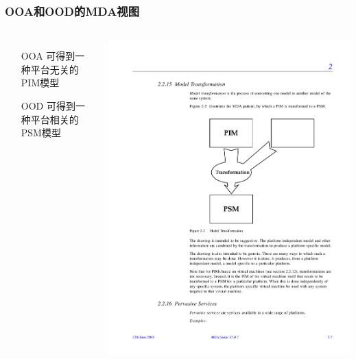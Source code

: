\documentclass[compress]{beamer}
\begin{document}
\begin{frame}
  \frametitle{OOA和OOD的MDA视图}
  \begin{columns}[c]
    \column{0.5\hsize}
    \begin{itemize}
      \item [OOA] 可得到一种平台无关的PIM模型
      \item [OOD] 可得到一种平台相关的PSM模型
\end{itemize}
    \column{0.5\hsize}
    \begin{center}
      \centering\includegraphics[width=0.8\hsize]{modeltrans.pdf}
    \end{center}
  \end{columns}
\end{frame}
\end{document}
